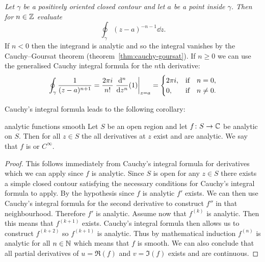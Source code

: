 \documentclass{article}
\begin{document}
    \begin{example}\label{exa:integral 1/z-a}
        \textit{Let \(\gamma\) be a positively oriented closed contour and let \(a\) be a point inside \(\gamma\). Then for \(n\in\mathbb{Z}\) evaluate}
        \[\oint_\gamma (z - a)^{-n-1}\dd{z}.\]
        If \(n < 0\) then the integrand is analytic and so the integral vanishes by the Cauchy--Goursat theorem (theorem~\ref{thm:cauchy-goursat}).
        If \(n \ge 0\) we can use the generalised Cauchy integral formula for the \(n\)th derivative:
        \[
            \oint_\gamma \frac{1}{(z - a)^{n + 1}} = \frac{2\pi i}{n!} \eval{\dv[n]{z}(1)}_{z=a} = 
            \begin{cases}
                2\pi i, & \qif*n = 0,\\
                0, & \qif*n \ne 0.
            \end{cases}
        \]
    \end{example}
    Cauchy's integral formula leads to the following corollary:
    \begin{corollary}{}{analytic functions smooth}
        Let \(S\) be an open region and let \(f\colon S\to\mathbb{C}\) be analytic on \(S\).
        Then for all \(z\in S\) the all derivatives at \(z\) exist and are analytic.
        We say that \(f\) is  or \(C^\infty\).
    \end{corollary}
    \begin{proof}
        This follows immediately from Cauchy's integral formula for derivatives which we can apply since \(f\) is analytic.
        Since \(S\) is open for any \(z\in S\) there exists a simple closed contour satisfying the necessary conditions for Cauchy's integral formula to apply.
        By the hypothesis since \(f\) is analytic \(f'\) exists.
        We can then use Cauchy's integral formula for the second derivative to construct \(f''\) in that neighbourhood.
        Therefore \(f'\) is analytic.
        Assume now that \(f^{(k)}\) is analytic.
        Then this means that \(f^{(k+1)}\) exists.
        Cauchy's integral formula then allows us to construct \(f^{(k+2)}\) so \(f^{(k + 1)}\) is analytic.
        Thus by mathematical induction \(f^{(n)}\) is analytic for all \(n\in\mathbb{N}\) which means that \(f\) is smooth.
        We can also conclude that all partial derivatives of \(u = \Re(f)\) and \(v = \Im(f)\) exists and are continuous.
    \end{proof}
    
\end{document}
